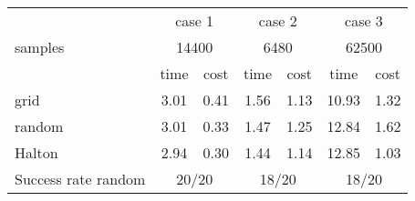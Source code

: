 \begin{tabular}{l c c c c c c}
\hline
& \multicolumn{2}{c}{case 1} &
  \multicolumn{2}{c}{case 2} &
  \multicolumn{2}{c}{case 3} \\
samples&
  \multicolumn{2}{c}{14400} &
  \multicolumn{2}{c}{6480} &
  \multicolumn{2}{c}{62500} \\
\hline
& time & cost & time & cost & time & cost \\
grid   & 3.01 & 0.41
       & 1.56 & 1.13
       & 10.93 & 1.32 \\
random & 3.01 & 0.33
       & 1.47 & 1.25
       & 12.84 & 1.62 \\
Halton & 2.94 & 0.30
       & 1.44 & 1.14
       & 12.85 & 1.03 \\
\hline
Success rate random &
  \multicolumn{2}{c}{20/20} &
  \multicolumn{2}{c}{18/20} &
  \multicolumn{2}{c}{18/20} \\
\hline
\end{tabular}
